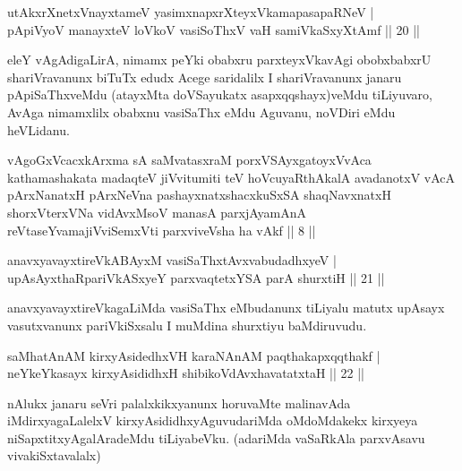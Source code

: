 
\begin{shl}
utAkxrXnetxV\s nayxtameV yasimxnapxrXteyxVkamapasapaRNeV | \\
pApiVyoV manayxteV loVkoV vasiSoThxV vaH samiVkaSxyXtAmf \hfill|| 20 || 
\end{shl}

\begin{artha}
eleY vAgAdigaLirA, nimamx peYki obabxru parxteyxVkavAgi obobxbabxrU 
shariVravanunx biTuTx edudx Acege saridalilx I shariVravanunx janaru 
pApiSaThxveMdu (atayxMta doVSayukatx asapxqqshayx)veMdu tiLiyuvaro, 
AvAga nimamxlilx obabxnu vasiSaThx eMdu Aguvanu, noVDiri eMdu 
heVLidanu.
\end{artha}

\begin{kandikeshl}
vAgoGxVcacxkArxma sA saMvatasxraM porxVSAyxgatoyxVvAca kathamashakata madaqteV jiVvitumiti teV hoVcuyaRthAkalA avadanotxV vAcA pArxNanatxH pArxNeVna pashayxnatxshacxkuSxSA shaqNavxnatxH shorxVterxVNa vidAvxMsoV manasA parxjAyamAnA reVtaseYvamajiVviSemxVti parxviveVsha ha vAkf || 8 ||
\end{kandikeshl}


\begin{shl}
anavxyavayxtireVkABAyxM vasiSaThxtAvxvabudadhxyeV | \\
upAsAyxthaRpariVkASxyeY parxvaqtetxYSA parA shurxtiH \hfill|| 21 || 
\end{shl}

\begin{artha}
anavxyavayxtireVkagaLiMda vasiSaThx eMbudanunx tiLiyalu matutx upAsayx vasutxvanunx pariVkiSxsalu I muMdina shurxtiyu baMdiruvudu.
\end{artha}


\begin{shl}
saMhatAnAM kirxyAsidedhxVH karaNAnAM paqthakapxqqthakf | \\
neYkeYkasayx kirxyAsididhxH shibikoVdAvxhavatatxtaH \hfill|| 22 || 
\end{shl}

\begin{artha}
nAlukx janaru seVri palalxkikxyanunx horuvaMte malinavAda 
iMdirxyagaLalelxV kirxyAsididhxyAguvudariMda oMdoMdakekx kirxyeya 
niSapxtitxyAgalAradeMdu tiLiyabeVku. (adariMda vaSaRkAla parxvAsavu 
vivakiSxtavalalx)
\end{artha}

